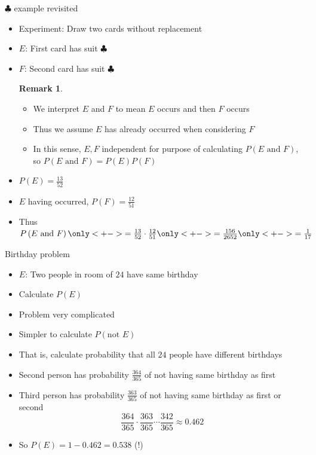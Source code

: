 \documentclass{beamer}
\theoremstyle{definition}
\newtheorem{remark}{Remark}
\begin{document}
\begin{frame}{$\clubsuit$ example revisited}
\begin{itemize}
\item Experiment: Draw two cards without replacement
\item $E$: First card has suit $\clubsuit$
\item $F$: Second card has suit $\clubsuit$
\begin{remark}
\begin{itemize}
\item We interpret \alert{$E$ and $F$} to mean $E$ occurs
\alert{and then} $F$ occurs
\item Thus we assume $E$ has already occurred when considering $F$
\item In this sense, $E,F$ \alert{independent} for purpose of calculating
$P\left(\text{$E$ and $F$}\right)$, so
$P\left(\text{$E$ and $F$}\right)=P\left(E\right)P\left(F\right)$
\end{itemize}
\end{remark}
\item $P\left(E\right)=\frac{13}{52}$
\item $E$ having occurred, $P\left(F\right)=\frac{12}{51}$
\item Thus $P\left(\text{$E$ and $F$}\right)
\only<+->{=\frac{13}{52}\cdot\frac{12}{51}}
\only<+->{=\frac{156}{2652}}\only<+->{=\frac{1}{17}}$
\end{itemize}
\end{frame}

\begin{frame}{Birthday problem}
\begin{itemize}
\item $E$: Two people in room of $24$ have same birthday
\item Calculate $P\left(E\right)$
\item Problem very complicated
\item Simpler to calculate $P\left(\text{not $E$}\right)$
\item That is, calculate probability that all $24$ people
have different birthdays
\item Second person has probability $\frac{364}{365}$ of
not having same birthday as first
\item Third person has probability $\frac{363}{365}$ of
not having same birthday as first or second
\[\frac{364}{365}
\cdot\frac{363}{365}
\cdots\frac{342}{365}\approx 0.462\]
\item So $P\left(E\right)=1-0.462=0.538$ (\alert{!})
\end{itemize}
\end{frame}
\end{document}
